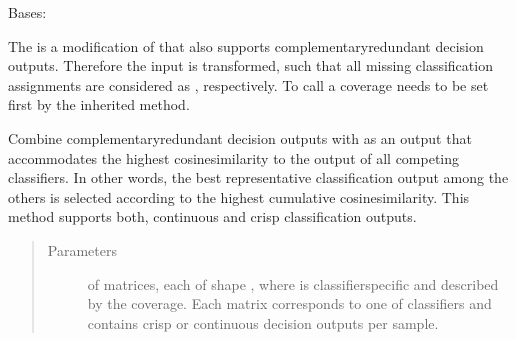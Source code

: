 \documentclass[letterpaper,10pt,english]{sphinxmanual}
\begin{document}
\begin{fulllineitems}
\label{\detokenize{pusion.core.cosine_similarity_combiner:pusion.core.cosine_similarity_combiner.CRCosineSimilarity}}
\sphinxAtStartPar
Bases: {\hyperref[\detokenize{pusion.core.cosine_similarity_combiner:pusion.core.cosine_similarity_combiner.CosineSimilarityCombiner}]{}}

\sphinxAtStartPar
The {\hyperref[\detokenize{pusion.core.cosine_similarity_combiner:pusion.core.cosine_similarity_combiner.CRCosineSimilarity}]{}} is a modification of {\hyperref[\detokenize{pusion.core.cosine_similarity_combiner:pusion.core.cosine_similarity_combiner.CosineSimilarityCombiner}]{}} that also supports
complementary\sphinxhyphen{}redundant decision outputs. Therefore the input is transformed, such that all missing classification
assignments are considered as , respectively. To call {\hyperref[\detokenize{pusion.core.cosine_similarity_combiner:pusion.core.cosine_similarity_combiner.CRCosineSimilarity.combine}]{}} a coverage needs to be set first
by the inherited  method.

\begin{fulllineitems}
\label{\detokenize{pusion.core.cosine_similarity_combiner:pusion.core.cosine_similarity_combiner.CRCosineSimilarity.combine}}
\sphinxAtStartPar
Combine complementary\sphinxhyphen{}redundant decision outputs with as an output that accommodates the highest
cosine\sphinxhyphen{}similarity to the output of all competing classifiers. In other words, the best representative
classification output among the others is selected according to the highest cumulative cosine\sphinxhyphen{}similarity.
This method supports both, continuous and crisp classification outputs.
\begin{quote}\begin{description}
\item[{Parameters}] \leavevmode
\sphinxAtStartPar
{} \textendash{}  of  matrices, each of shape ,
where  is classifier\sphinxhyphen{}specific and described by the coverage. Each matrix corresponds to
one of  classifiers and contains crisp or continuous decision outputs per sample.


\end{description}
\end{quote}
\end{fulllineitems}
\end{fulllineitems}
\end{document}
